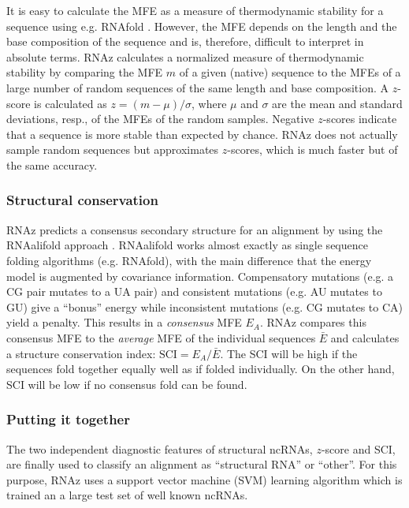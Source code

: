\documentclass[11pt]{article}
\begin{document}
It is easy to calculate the MFE as a measure of thermodynamic stability for
a sequence using e.g. RNAfold \cite{hofacker94a}. However, the MFE depends
on the length and the base composition of the sequence and is, therefore,
difficult to interpret in absolute terms. RNAz calculates a normalized
measure of thermodynamic stability by comparing the MFE $m$ of a given
(native) sequence to the MFEs of a large number of random sequences of the
same length and base composition. A $z$-score is calculated as
$z=(m-\mu)/\sigma$, where $\mu$ and $\sigma$ are the mean and standard
deviations, resp., of the MFEs of the random samples. Negative $z$-scores
indicate that a sequence is more stable than expected by chance.  RNAz does
not actually sample random sequences but approximates $z$-scores, which is
much faster but of the same accuracy.

\subsubsection{Structural conservation}
\label{sec:struct-cons}

RNAz predicts a consensus secondary structure for an alignment by using the
RNAalifold approach \cite{hofacker02}. RNAalifold works almost exactly as
single sequence folding algorithms (e.g. RNAfold), with the main difference
that the energy model is augmented by covariance information. Compensatory
mutations (e.g. a CG pair mutates to a UA pair) and consistent mutations
(e.g. AU mutates to GU) give a ``bonus'' energy while inconsistent
mutations (e.g. CG mutates to CA) yield a penalty. This results in a
\emph{consensus} MFE $E_A$. RNAz compares this consensus MFE to the
\emph{average} MFE of the individual sequences $\bar E$ and calculates a
structure conservation index: $\textrm{SCI}= E_A/\bar E $. The SCI will be
high if the sequences fold together equally well as if folded individually.
On the other hand, SCI will be low if no consensus fold can be found.

\subsubsection{Putting it together}

The two independent diagnostic features of structural ncRNAs, $z$-score and
SCI, are finally used to classify an alignment as ``structural RNA'' or
``other''. For this purpose, RNAz uses a support vector machine (SVM)
learning algorithm which is trained an a large test set of well known
ncRNAs.
\end{document}
